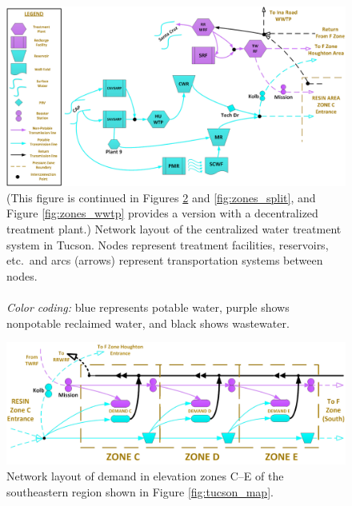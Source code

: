 \documentclass[12pt]{amsart}
\begin{document}
\begin{figure}[!ht]
	\centering
	\includegraphics[width=.8\textwidth]{images/nodes_central}
	\caption{ (This figure is continued in Figures \ref{fig:zones_c_e} and \ref{fig:zones_split}, and Figure \ref{fig:zones_wwtp} provides a version with a decentralized treatment plant.)
		Network layout of the centralized water treatment system in Tucson.
		Nodes represent treatment facilities, reservoirs, etc.\ and arcs (arrows) represent transportation systems between nodes.\\ \\
		{\it Color coding:} blue represents potable water, purple shows nonpotable reclaimed water, and black shows wastewater.		\bigskip 
	}
	\label{fig:nodes_central}
\end{figure}

\bigskip 

\bigskip 

\begin{figure}[!hbpt]
	\centering
	\includegraphics[width=.8\textwidth]{images/zones_c_e}
	\caption{
		Network layout of demand in elevation zones C--E of the southeastern region shown in Figure \ref{fig:tucson_map}.\bigskip 
	}
	\label{fig:zones_c_e}
\end{figure}

\bigskip 
\end{document}
